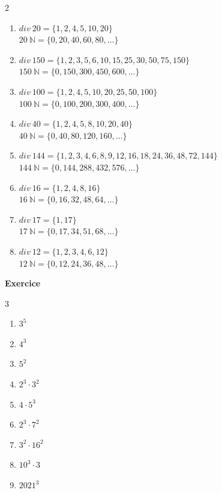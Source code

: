 \documentclass[10pt,a4paper]{article}
\newcounter{nexo}
\begin{document}
\begin{multicols}{2}
	\begin{enumerate}[label=\alph*)]
	\item $div\ 20=\{1,2,4,5,10,20\}$\\
	$20\ \mathbb{N}=\{0,20,40,60,80,\ldots\}$
	\item $div\ 150=\{1,2,3,5,6,10,15,25,30,50,75,150\}$\\
	$150\ \mathbb{N}=\{0,150,300,450,600,\ldots\}$
	\item $div\ 100=\{1,2,4,5,10,20,25,50,100\}$\\
	$100\ \mathbb{N}=\{0,100,200,300,400,\ldots\}$
	\item $div\ 40=\{1,2,4,5,8,10,20,40\}$\\
	$40\ \mathbb{N}=\{0,40,80,120,160,\ldots\}$
	\item $div\ 144=\{1,2,3,4,6,8,9,12,16,18,24,36,48,72,144\}$\\
	$144\ \mathbb{N}=\{0,144,288,432,576,\ldots\}$
	\item $div\ 16=\{1,2,4,8,16\}$\\
	$16\ \mathbb{N}=\{0,16,32,48,64,\ldots\}$
	\item $div\ 17=\{1,17\}$\\
	$17\ \mathbb{N}=\{0,17,34,51,68,\ldots\}$
	\item $div\ 12=\{1,2,3,4,6,12\}$\\
	$12\ \mathbb{N}=\{0,12,24,36,48,\ldots\}$
\end{enumerate}
\end{multicols}

\textbf{Exercice \thenexo} 
\begin{multicols}{3}
	\begin{enumerate}[label=\alph*)]
		\item $3^5$
		\item $4^3$
		\item $5^2$
		\item $2^3\cdot 3^2$
		\item $4\cdot 5^3$
		\item $2^3\cdot 7^2$
		\item $3^2\cdot 16^2$
		\item $10^3\cdot 3$
		\item $2021^3$
	\end{enumerate}
\end{multicols}
\end{document}
